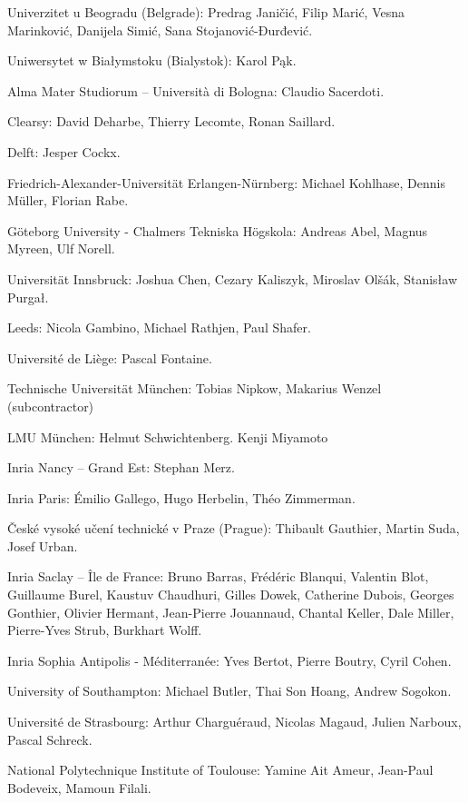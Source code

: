 Univerzitet u Beogradu (Belgrade): Predrag Janičić, Filip Marić, Vesna Marinković, Danijela Simić, Sana Stojanović-Đurđević.

Uniwersytet w Białymstoku (Bialystok): Karol Pąk.

Alma Mater Studiorum – Università di Bologna: Claudio Sacerdoti.

Clearsy: David Deharbe, Thierry Lecomte, Ronan Saillard.

Delft: Jesper Cockx.

Friedrich-Alexander-Universität Erlangen-Nürnberg: Michael Kohlhase, Dennis Müller, Florian Rabe.

G\"oteborg University - Chalmers Tekniska H\"ogskola: Andreas Abel, Magnus Myreen, Ulf Norell.

Universität Innsbruck: Joshua Chen, Cezary Kaliszyk, Miroslav Olšák, Stanisław Purgał.

Leeds: Nicola Gambino, Michael Rathjen, Paul Shafer.

Université de Liège: Pascal Fontaine.

Technische Universität München: Tobias Nipkow, Makarius Wenzel (subcontractor)

LMU München: Helmut Schwichtenberg. Kenji Miyamoto 

Inria Nancy – Grand Est: Stephan Merz.

Inria Paris: Émilio Gallego, Hugo Herbelin, Théo Zimmerman.

České vysoké učení technické v Praze (Prague): Thibault Gauthier, Martin Suda, Josef Urban.

Inria Saclay – Île de France: Bruno Barras, Frédéric Blanqui, Valentin Blot, Guillaume Burel, Kaustuv Chaudhuri, Gilles Dowek, Catherine Dubois, Georges Gonthier, Olivier Hermant, Jean-Pierre Jouannaud, Chantal Keller, Dale Miller, Pierre-Yves Strub, Burkhart Wolff.

Inria Sophia Antipolis - Méditerranée: Yves Bertot, Pierre Boutry, Cyril Cohen.

University of Southampton: Michael Butler, Thai Son Hoang, Andrew Sogokon.

Université de Strasbourg: Arthur Charguéraud, Nicolas Magaud, Julien Narboux, Pascal Schreck.

National Polytechnique Institute of Toulouse: Yamine Ait Ameur, Jean-Paul Bodeveix, Mamoun Filali. 



